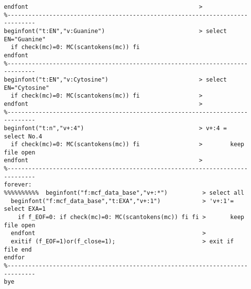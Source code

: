 \documentclass[a4paper]{article}
\begin{document}
\begin{verbatim}
endfont                                                 >
%------------------------------------------------------------------------------
beginfont("t:EN","v:Guanine")                           > select EN="Guanine"
  if check(mc)=0: MC(scantokens(mc)) fi                 
endfont
%------------------------------------------------------------------------------
beginfont("t:EN","v:Cytosine")                          > select EN="Cytosine"
  if check(mc)=0: MC(scantokens(mc)) fi                 >
endfont                                                 >
%------------------------------------------------------------------------------
beginfont("t:n","v+:4")                                 > v+:4 = select No.4
  if check(mc)=0: MC(scantokens(mc)) fi                 >        keep file open
endfont                                                 >
%------------------------------------------------------------------------------
forever:
%%%%%%%%%%  beginfont("f:mcf_data_base","v+:*")          > select all
  beginfont("f:mcf_data_base","t:EXA","v+:1")            > 'v+:1'= select EXA=1
    if f_EOF=0: if check(mc)=0: MC(scantokens(mc)) fi fi >       keep file open
  endfont                                                >    
  exitif (f_EOF=1)or(f_close=1);                         > exit if file end
endfor
%------------------------------------------------------------------------------
bye
\end{verbatim}
\noindent%
\newpage
\end{document}
